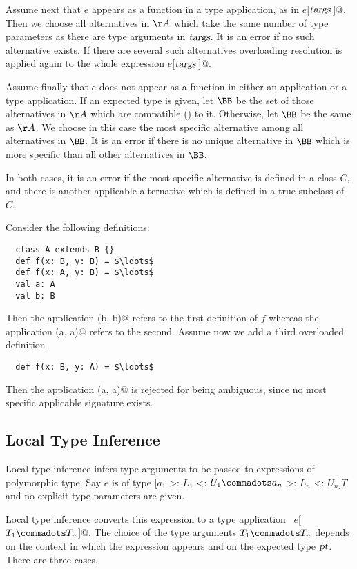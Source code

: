 Assume next that $e$ appears as a function in a type application, as
in \lstinline@$e$[$\mbox{\sl targs}\,$]@. Then we choose all alternatives in
$\AA$ which take the same number of type parameters as there are type
arguments in $\mbox{\sl targs}$. It is an error if no such alternative exists.
If there are several such alternatives overloading resolution is
applied again to the whole expression \lstinline@$e$[$\mbox{\sl targs}\,$]@.  

Assume finally that $e$ does not appear as a function in either
an application or a type application. If an expected type is given,
let $\BB$ be the set of those alternatives in $\AA$ which are
compatible () to it. Otherwise, let $\BB$ be the same as $\AA$.
We choose in this case the most specific alternative among all
alternatives in $\BB$. It is an error if there is no unique
alternative in $\BB$ which is more specific than all other
alternatives in $\BB$.

In both cases, it is an error if the most specific alternative is
defined in a class $C$, and there is another applicable alternative
which is defined in a true subclass of $C$.

\example Consider the following definitions:

\begin{lstlisting}
  class A extends B {}
  def f(x: B, y: B) = $\ldots$
  def f(x: A, y: B) = $\ldots$
  val a: A 
  val b: B
\end{lstlisting}
Then the application \lstinline@f(b, b)@ refers to the first
definition of $f$ whereas the application \lstinline@f(a, a)@
refers to the second.  Assume now we add a third overloaded definition
\begin{lstlisting}
  def f(x: B, y: A) = $\ldots$
\end{lstlisting}
Then the application \lstinline@f(a, a)@ is rejected for being ambiguous, since
no most specific applicable signature exists.

\subsection{Local Type Inference}
\label{sec:local-type-inf}

Local type inference infers type arguments to be passed to expressions
of polymorphic type. Say $e$ is of type [$a_1$ >: $L_1$ <: $U_1
\commadots a_n$ >: $L_n$ <: $U_n$]$T$ and no explicit type parameters
are given. 

Local type inference converts this expression to a type
application ~\lstinline@$e$[$T_1 \commadots T_n$]@. The choice of the
type arguments $T_1 \commadots T_n$ depends on the context in which
the expression appears and on the expected type $\mbox{\sl pt}$. 
There are three cases.

